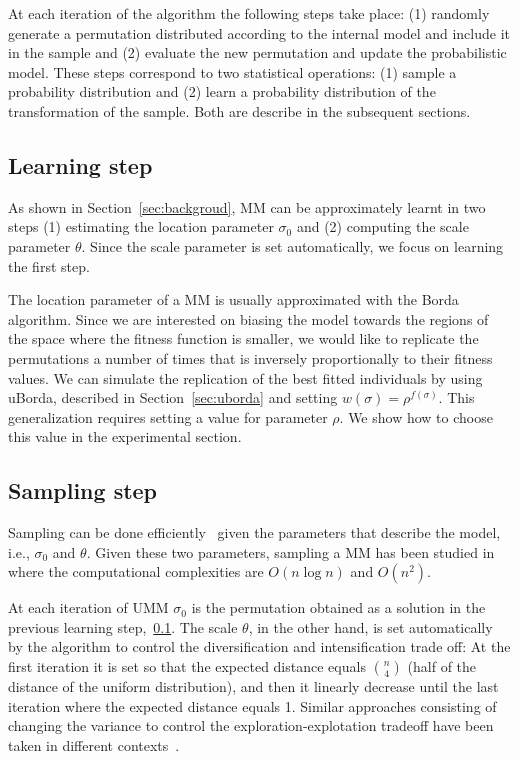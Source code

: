 \documentclass[runningheads]{llncs}
\begin{document}
At each iteration of the algorithm the following steps take place: (1) randomly generate a permutation distributed according to the internal model and include it in the sample and (2) evaluate the new permutation and update the probabilistic model. These steps correspond to two statistical operations: (1) sample a probability distribution and (2) learn a probability distribution of the transformation of the sample. Both are describe in the subsequent sections. 

\subsection{Learning step}\label{sec:learning}

As shown in Section~\ref{sec:backgroud}, MM can be approximately learnt in two steps (1) estimating the location parameter $\sigma_0$ and (2) computing the scale parameter $\theta$. Since the scale parameter is set automatically, we focus on learning the first step. 

The location parameter of a MM is usually approximated with the Borda algorithm. Since we are interested on biasing the model towards the regions of the space where the fitness function is smaller, we would like to replicate the permutations a number of times that is inversely proportionally to their fitness values.
We can simulate the replication of the best fitted individuals by using uBorda, described in Section~\ref{sec:uborda} and setting $w(\sigma)=\rho^{f(\sigma)}$. This generalization requires setting a value for parameter $\rho$. We show how to choose this value in the experimental section. 


\subsection{Sampling step}
Sampling can be done efficiently~\cite{Irurozki2016b} given the parameters that describe the model, i.e., $\sigma_0$ and $\theta$. Given these two parameters, sampling a MM has been studied in \cite{Collas}\cite{Irurozki2016b}\cite{Regenwetter2004} where the computational complexities are $O(n\log n)$ and $O(n^2)$.


At each iteration of UMM $\sigma_0$ is the permutation obtained as a solution in the previous learning step,~\ref{sec:learning}. The scale $\theta$, in the other hand, is set automatically by the algorithm to control the diversification and intensification trade off: At the first iteration it is set so that the expected distance equals  ${n\choose 4}$ (half of the distance of the uniform distribution), and then it linearly decrease until the last iteration where the expected distance equals 1. Similar approaches consisting of changing the variance to control the exploration-explotation tradeoff have been taken in different contexts~\cite{arza2019approaching}.
\end{document}
